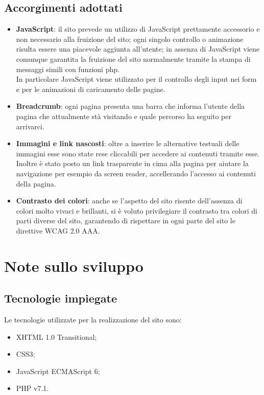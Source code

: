 \documentclass[a4paper,12pt]{article}
\begin{document}
\subsection{Accorgimenti adottati}
\begin{itemize}
	\item \textbf{JavaScript}: il sito prevede un utilizzo di JavaScript prettamente accessorio e non necessario alla fruizione del sito; ogni singolo controllo o animazione risulta essere una piacevole aggiunta all'utente; in assenza di JavaScript viene comunque garantita la fruizione del sito normalmente tramite la stampa di messaggi simili con funzioni php.\\
	In particolare JavaScript viene utilizzato per il controllo degli input nei form e per le animazioni di caricamento delle pagine.
	
	\item \textbf{Breadcrumb}: ogni pagina presenta una barra che informa l'utente della pagina che attualmente stà visitando e quale percorso ha seguito per arrivarci.
	
	\item \textbf{Immagini e link nascosti}: oltre a inserire le alternative testuali delle immagini esse sono state rese cliccabili per accedere ai contenuti tramite esse.\\
	Inoltre è stato posto un link trasparente in cima alla pagina per aiutare la navigazione per esempio da screen reader, accellerando l'accesso ai contenuti della pagina.
	
	\item \textbf{Contrasto dei colori}: anche se l'aspetto del sito risente dell'assenza di colori molto vivaci e brillanti, si è voluto privilegiare il contrasto tra colori di parti diverse del sito, garantendo di rispettare in ogni parte del sito le direttive WCAG 2.0 AAA.
\end{itemize}
\section{Note sullo sviluppo}
\subsection{Tecnologie impiegate}
Le tecnologie utilizzate per la realizzazione del sito sono:
\begin{itemize}
	\item XHTML 1.0 Transitional;
	\item CSS3;
	\item JavaScript ECMAScript 6;
	\item PHP v7.1.
\end{itemize}
\end{document}
